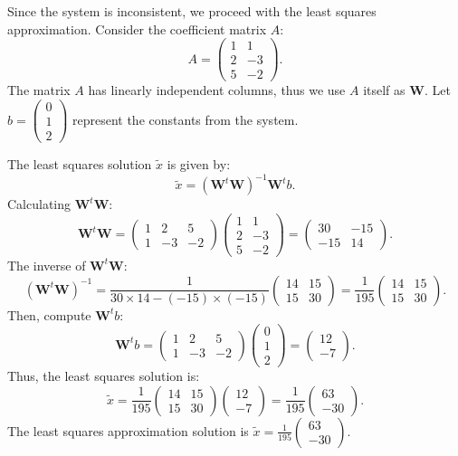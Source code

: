 \documentclass{report}
\begin{document}
Since the system is inconsistent, we proceed with the least squares approximation. Consider the coefficient matrix $A$:
\[
A = \begin{pmatrix} 1 & 1 \\ 2 & -3 \\ 5 & -2 \end{pmatrix}.
\]
The matrix $A$ has linearly independent columns, thus we use $A$ itself as $\mathbf{W}$. Let $b = \begin{pmatrix} 0 \\ 1 \\ 2 \end{pmatrix}$ represent the constants from the system.

The least squares solution $\tilde{x}$ is given by:
\[
\tilde{x} = (\mathbf{W}^t\mathbf{W})^{-1}\mathbf{W}^tb.
\]
Calculating $\mathbf{W}^t\mathbf{W}$:
\[
\mathbf{W}^t\mathbf{W} = \begin{pmatrix} 1 & 2 & 5 \\ 1 & -3 & -2 \end{pmatrix} \begin{pmatrix} 1 & 1 \\ 2 & -3 \\ 5 & -2 \end{pmatrix} = \begin{pmatrix} 30 & -15 \\ -15 & 14 \end{pmatrix}.
\]
The inverse of $\mathbf{W}^t\mathbf{W}$:
\[
(\mathbf{W}^t\mathbf{W})^{-1} = \frac{1}{30 \times 14 - (-15) \times (-15)} \begin{pmatrix} 14 & 15 \\ 15 & 30 \end{pmatrix} = \frac{1}{195} \begin{pmatrix} 14 & 15 \\ 15 & 30 \end{pmatrix}.
\]
Then, compute $\mathbf{W}^tb$:
\[
\mathbf{W}^tb = \begin{pmatrix} 1 & 2 & 5 \\ 1 & -3 & -2 \end{pmatrix} \begin{pmatrix} 0 \\ 1 \\ 2 \end{pmatrix} = \begin{pmatrix} 12 \\ -7 \end{pmatrix}.
\]
Thus, the least squares solution is:
\[
\tilde{x} = \frac{1}{195} \begin{pmatrix} 14 & 15 \\ 15 & 30 \end{pmatrix} \begin{pmatrix} 12 \\ -7 \end{pmatrix} = \frac{1}{195} \begin{pmatrix} 63 \\ -30 \end{pmatrix}.
\]
The least squares approximation solution is $\tilde{x} = \frac{1}{195} \begin{pmatrix} 63 \\ -30 \end{pmatrix}$.
\end{document}
